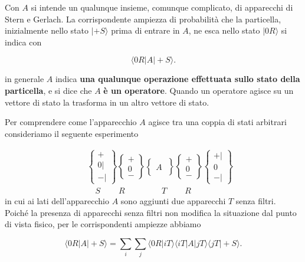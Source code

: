 Con $A$ si intende un qualunque insieme, comunque complicato, di apparecchi di Stern e Gerlach. La corrispondente ampiezza di probabilità che la particella, inizialmente nello stato $| +S \rangle$ prima di entrare in $A$, ne esca nello stato $| 0R \rangle$ si indica con

\begin{equation}
\langle 0R|A| +S \rangle .
\end{equation}

in generale $A$ indica \textbf{una qualunque operazione effettuata sullo stato della particella}, e si dice che $A$ \textbf{è un operatore}. Quando un operatore agisce su un vettore di stato la trasforma in un altro vettore di stato.

Per comprendere come l'apparecchio $A$ agisce tra una coppia di stati arbitrari consideriamo il seguente esperimento

\begin{eqnarray}
& &\begin{Bmatrix}
 + \\ 0 | \\ - |  
\end{Bmatrix}
\begin{Bmatrix}
  + \\ 0  \\ -   
\end{Bmatrix}
\begin{Bmatrix}
\quad \\  A  \\ \quad 
\end{Bmatrix}
\begin{Bmatrix}
  + \\ 0  \\ -   
\end{Bmatrix}
\begin{Bmatrix}
  +| \\ 0  \\ -|   
\end{Bmatrix} \\
& & \quad S  \ \qquad R\ \qquad  \ \qquad T\ \qquad R \nonumber
\end{eqnarray}
in cui ai lati dell'apparecchio $A$ sono aggiunti due apparecchi $T$ senza filtri. Poiché la presenza di apparecchi senza filtri non modifica la situazione dal punto di vista fisico, per le corrispondenti ampiezze abbiamo

\begin{equation}
\langle 0R|A| +S \rangle = \sum \limits_{i} \sum \limits_{j} \langle 0R | iT \rangle \langle iT | A | jT \rangle \langle jT | +S \rangle .
\end{equation}

